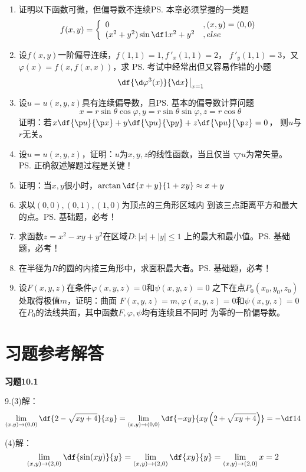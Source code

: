 \begin{enumerate}
  \setlength{\itemindent}{1cm}
  \item 证明以下函数可微，但偏导数不连续\ps{本章必须掌握的一类题}
  	$$
	f(x,y)=\left\{\begin{array}{ll}
	0 & ,(x,y)=(0,0)\\
	(x^2+y^2)\sin\df1{x^2+y^2}& ,else
	\end{array}\right.
	$$
  \item 设$f(x,y)$一阶偏导连续，$f(1,1)=1,f\,'_x(1,1)=2$，
	$f\,'_y(1,1)=3$，又$\varphi(x)=f(x,f(x,x))$，求
	\ps{考试中经常出但又容易作错的小题}
	$$\left.\df{\d\varphi^3(x)}{\d x}\right|_{x=1}$$
  \item 设$u=u(x,y,z)$具有连续偏导数，且\ps{基本的偏导数计算问题}
	$$x=r\sin\theta\cos\varphi,y=r\sin\theta\sin\varphi,z=r\cos\theta$$
	证明：若$x\df{\p u}{\p x}+y\df{\p u}{\p y}+z\df{\p u}{\p z}=0$，
	则$u$与$r$无关。
  \item 设$u=u(x,y,z)$，证明：$u$为$x,y,z$的线性函数，当且仅当
	$\bigtriangledown u$为常矢量。	\ps{正确叙述解题过程是关键！}
  \item 证明：当$x,y$很小时，$\arctan\df{x+y}{1+xy}\approx x+y$
  \item 求以$(0,0),(0,1),(1,0)$为顶点的三角形区域内
	到该三点距离平方和最大的点。\ps{基础题，必考！}
  \item 求函数$z=x^2-xy+y^2$在区域$D:|x|+|y|\leq 1$
	上的最大和最小值。\ps{基础题，必考！}
  \item 在半径为$R$的圆的内接三角形中，求面积最大者。\ps{基础题，必考！}
  \item 设$F(x,y,z)$在条件$\varphi(x,y,z)=0$和$\psi(x,y,z)=0$
	之下在点$P_0(x_0,y_0,z_0)$处取得极值$m$，证明：曲面
	$F(x,y,z)=m,\varphi(x,y,z)=0$和$\psi(x,y,z)=0$
	在$P_0$的法线共面，其中函数$F,\varphi,\psi$均有连续且不同时
	为零的一阶偏导数。
\end{enumerate}

\newpage

\section*{习题参考解答}

{\bf 习题10.1}

9.(3)\;解：
$$
	\lim\limits_{(x,y)\to(0,0)}\df{2-\sqrt{xy+4}}{xy}
	=\lim\limits_{(x,y)\to(0,0)}\df{-xy}{xy\left(2+\sqrt{xy+4}\right)}
	=-\df14
$$

(4)\;解：
$$
	\lim\limits_{(x,y)\to(2,0)}\df{\sin(xy)}{y}
	=\lim\limits_{(x,y)\to(2,0)}\df{xy}{y}
	=\lim\limits_{(x,y)\to(2,0)}x=2
$$

